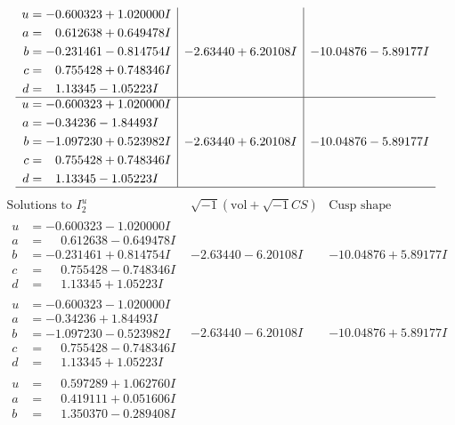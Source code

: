 \documentclass[1p]{elsarticle_modified}
\theoremstyle{definition}
\newcommand{\I}{\sqrt{-1}}
\begin{document}
$$\begin{array}{c|c|c}
\begin{aligned}
u &= -0.600323 + 1.020000 I \\
a &= \phantom{-}0.612638 + 0.649478 I \\
b &= -0.231461 - 0.814754 I \\
c &= \phantom{-}0.755428 + 0.748346 I \\
d &= \phantom{-}1.13345 - 1.05223 I\end{aligned}
 & -2.63440 + 6.20108 I & -10.04876 - 5.89177 I \\ \hline\begin{aligned}
u &= -0.600323 + 1.020000 I \\
a &= -0.34236 - 1.84493 I \\
b &= -1.097230 + 0.523982 I \\
c &= \phantom{-}0.755428 + 0.748346 I \\
d &= \phantom{-}1.13345 - 1.05223 I\end{aligned}
 & -2.63440 + 6.20108 I & -10.04876 - 5.89177 I\\
 \hline 
 \end{array}$$\newpage$$\begin{array}{c|c|c}  
\text{Solutions to }I^u_{2}& \I (\text{vol} + \sqrt{-1}CS) & \text{Cusp shape}\\
 \hline 
\begin{aligned}
u &= -0.600323 - 1.020000 I \\
a &= \phantom{-}0.612638 - 0.649478 I \\
b &= -0.231461 + 0.814754 I \\
c &= \phantom{-}0.755428 - 0.748346 I \\
d &= \phantom{-}1.13345 + 1.05223 I\end{aligned}
 & -2.63440 - 6.20108 I & -10.04876 + 5.89177 I \\ \hline\begin{aligned}
u &= -0.600323 - 1.020000 I \\
a &= -0.34236 + 1.84493 I \\
b &= -1.097230 - 0.523982 I \\
c &= \phantom{-}0.755428 - 0.748346 I \\
d &= \phantom{-}1.13345 + 1.05223 I\end{aligned}
 & -2.63440 - 6.20108 I & -10.04876 + 5.89177 I \\ \hline\begin{aligned}
u &= \phantom{-}0.597289 + 1.062760 I \\
a &= \phantom{-}0.419111 + 0.051606 I \\
b &= \phantom{-}1.350370 - 0.289408 I \\

\end{aligned}
\end{array}$$
\end{document}
